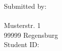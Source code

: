 \begin{titlepage}
\begin{adjustwidth}{-2cm}{}
\vspace*{0.6cm}
\begin{flushleft}
Submitted by: \\
\vspace*{7pt}
\authorname\\
Musterstr. 1\\
99999 Regensburg\\
Student ID: \studentID\\




\end{flushleft}

\end{adjustwidth}

\end{titlepage}

\newpage

